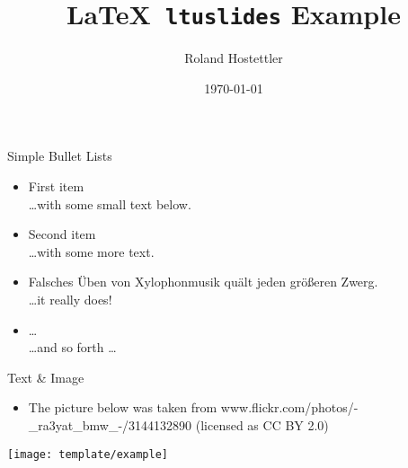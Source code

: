 \documentclass{rhsleek}
\begin{document}
\title{\LaTeX~\texttt{ltuslides} Example}
\author{Roland Hostettler}
\date{\today}
\maketitle


\begin{slide}{Simple Bullet Lists}
	\begin{itemize}
		\item First item\\
		    {\small \dots with some small text below.}

		\item Second item\\
		    {\small \dots with some more text.}

		\item Falsches Üben von Xylophonmusik quält jeden größeren Zwerg.\\
		    {\small \dots it really does!}

		\item \dots\\
		    {\small \dots and so forth \dots}
	\end{itemize}
\end{slide}


\begin{slide}{Text \& Image}
	\begin{itemize}
		\item The picture below was taken from www.flickr.com/photos/-\_ra3yat\_bmw\_-/3144132890 (licensed as CC BY 2.0)
	\end{itemize}
	\vspace{0.5cm}
	\begin{center}
		\texttt{[image: template/example]}
	\end{center}
\end{slide}
\end{document}
